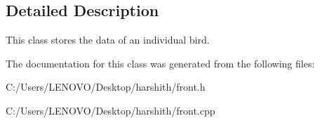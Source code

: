 \subsection{Detailed Description}
This class stores the data of an individual bird. 

The documentation for this class was generated from the following files\+:\begin{DoxyCompactItemize}
\item 
C\+:/\+Users/\+L\+E\+N\+O\+V\+O/\+Desktop/harshith/front.\+h\item 
C\+:/\+Users/\+L\+E\+N\+O\+V\+O/\+Desktop/harshith/front.\+cpp\end{DoxyCompactItemize}
